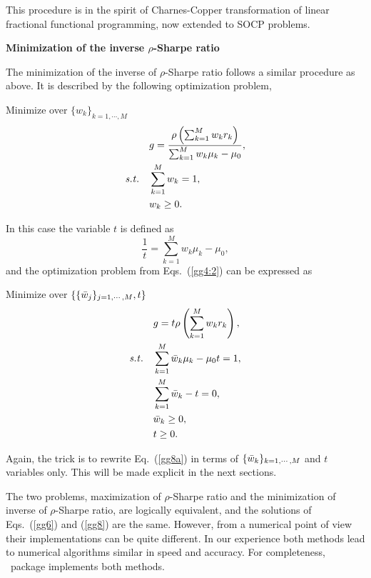 \begin{description}
    This procedure is in the spirit of Charnes-Copper transformation \cite{Charnes} of linear fractional functional programming,
    now extended to SOCP problems.


  \item[F.\label{MinSharpe}] {\bf Minimization of the inverse $\rho$-Sharpe ratio}

    The minimization of the inverse of $\rho$-Sharpe ratio follows a similar procedure as above.
    It is described by the following optimization problem,

    \bigskip
    \noindent Minimize over $\{w_k\}_{k=1,\cdots,M}$
    \begin{subequations}\label{gg4:2}
    \begin{align}
        & g = \frac{\rho\left(\sum_{k=1}^M w_k r_k \right)}{ \sum_{k=1}^M w_k \mu_k - \mu_0}, \label{gg4a:2} \\
        \st & \sum_{k=1}^M w_k = 1, \label{gg4b:2} \\
            & w_k \ge 0. \label{gg4c:2}
    \end{align}
    \end{subequations}

    \noindent In this case the variable $t$ is defined as
    \begin{equation}
      \frac{1}{t} = \sum_{k=1}^M w_k \mu_k - \mu_0, \label{gg7}
    \end{equation}
    and the optimization problem from Eqs.~(\ref{gg4:2}) can be expressed as

    \bigskip
    \noindent Minimize over $\{\{{\bar w}_j\}_{j=1,\cdots,M}, t\}$
    \begin{subequations}\label{gg8}
    \begin{align}
        & g = t \rho\left(\sum_{k=1}^M w_k r_k \right), \label{gg8a} \\
        \st & \sum_{k=1}^M \bw_k \mu_k - \mu_0 t = 1, \label{gg8b} \\
            & \sum_{k=1}^M \bw_k - t = 0, \label{gg8c} \\
            & \bw_k \ge 0, \label{gg8d} \\
            & t \ge 0. \label{gg8e}
    \end{align}
    \end{subequations}

    \noindent Again, the trick is to rewrite Eq.~(\ref{gg8a}) in terms of $\{{\bar w}_k\}_{k=1,\cdots,M}$ and $t$ variables only.
    This will be made explicit in the next sections.
\end{description}

\noindent The two problems, maximization of $\rho$-Sharpe ratio and the minimization of inverse of $\rho$-Sharpe ratio, are logically
equivalent, and the solutions of Eqs.~(\ref{gg6}) and (\ref{gg8}) are the same. However, from a numerical
point of view their implementations can be quite different. In our experience both methods lead to numerical algorithms 
similar in speed and accuracy. For completeness, \azapy\ package implements both methods.


\BackToContents
